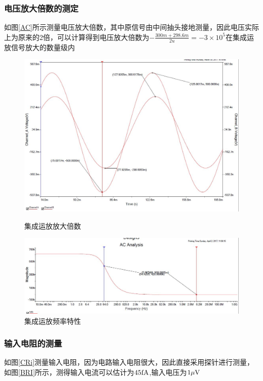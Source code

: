 \documentclass[UTF8,a4paper]{ctexart}
\begin{document}
\subsubsection{电压放大倍数的测定}
如图\ref{AC}所示测量电压放大倍数，其中原信号由中间抽头接地测量，因此电压实际上为原来的2倍，可以计算得到电压放大倍数为$-\frac{300m+298.6m}{2u}=-3\times10^5$在集成运放信号放大的数量级内
\begin{figure}
\centering
\includegraphics[width=\textwidth]{3-3A.jpg}
\caption{集成运放放大倍数}
\label{AC}
\includegraphics[width=\textwidth]{3f.JPG}
\caption{集成运放频率特性}
\label{f}
\end{figure}
\subsubsection{输入电阻的测量}
如图\ref{CRi}测量输入电阻，因为电路输入电阻很大，因此直接采用探针进行测量，如图\ref{BRI}所示，测得输入电流可以估计为$45\rm{fA}$,输入电压为$1\mu\rm{V}$
\end{document}
